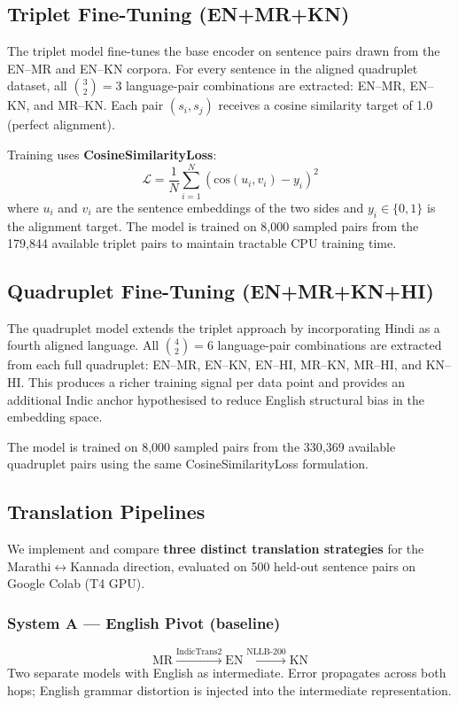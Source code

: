 \documentclass[conference,letterpaper]{IEEEtran}
\begin{document}
\subsection{Triplet Fine-Tuning (EN+MR+KN)}
The triplet model fine-tunes the base encoder on sentence pairs drawn
from the EN--MR and EN--KN corpora. For every sentence in the aligned
quadruplet dataset, all $\binom{3}{2} = 3$ language-pair combinations
are extracted: EN--MR, EN--KN, and MR--KN. Each pair $(s_i, s_j)$
receives a cosine similarity target of 1.0 (perfect alignment).

Training uses \textbf{CosineSimilarityLoss}:
\begin{equation}
\mathcal{L} = \frac{1}{N}\sum_{i=1}^{N}\left(\text{cos}(u_i,v_i) - y_i\right)^2
\end{equation}
where $u_i$ and $v_i$ are the sentence embeddings of the two sides
and $y_i \in \{0, 1\}$ is the alignment target. The model is trained
on 8,000 sampled pairs from the 179,844 available triplet pairs to
maintain tractable CPU training time.

\subsection{Quadruplet Fine-Tuning (EN+MR+KN+HI)}
The quadruplet model extends the triplet approach by incorporating
Hindi as a fourth aligned language. All $\binom{4}{2} = 6$
language-pair combinations are extracted from each full quadruplet:
EN--MR, EN--KN, EN--HI, MR--KN, MR--HI, and KN--HI. This produces
a richer training signal per data point and provides an additional
Indic anchor hypothesised to reduce English structural bias in the
embedding space.

The model is trained on 8,000 sampled pairs from the 330,369 available
quadruplet pairs using the same CosineSimilarityLoss formulation.

\subsection{Translation Pipelines}
We implement and compare \textbf{three distinct translation strategies}
for the Marathi$\leftrightarrow$Kannada direction, evaluated on 500
held-out sentence pairs on Google Colab (T4 GPU).

\subsubsection{System A — English Pivot (baseline)}
\begin{equation}
\text{MR} \xrightarrow{\text{IndicTrans2}} \text{EN}
\xrightarrow{\text{NLLB-200}} \text{KN}
\end{equation}
Two separate models with English as intermediate. Error propagates
across both hops; English grammar distortion is injected into the
intermediate representation.
\end{document}
